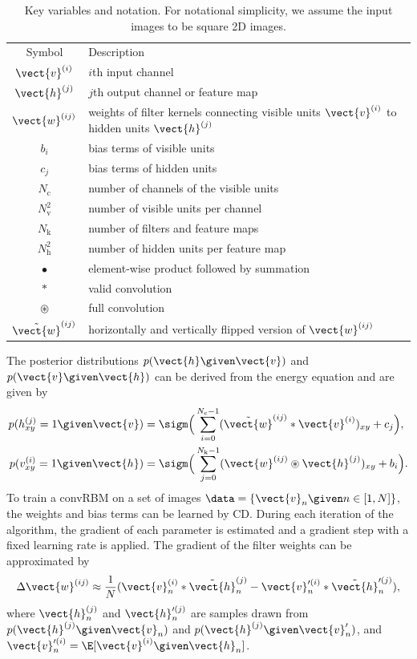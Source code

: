 \begin{table} 
\caption{Key variables and notation. For notational simplicity,
we assume the input images to be square 2D images.}
\label{tab:notation}
\begin{center}
\begin{tabular}{@{}cL{10cm}@{}}
\toprule
Symbol & Description \\
\cmidrule(r){1-1}\cmidrule(l){2-2}
$\vect{v}^{(i)}$ & $i$th input channel \\
$\vect{h}^{(j)}$ & $j$th output channel or feature map \\
$\vect{w}^{(ij)}$ & weights of filter kernels connecting visible units
$\vect{v}^{(i)}$ to hidden units $\vect{h}^{(j)}$ \\
$b_i$ & bias terms of visible units \\
$c_j$ & bias terms of hidden units \\
$N_\text{c}$ & number of channels of the visible units \\
$N_\text{v}^2$ & number of visible units per channel \\
$N_\text{k}$ & number of filters and feature maps \\
$N_\text{h}^2$ & number of hidden units per feature map \\
$\bullet$ & element-wise product followed by summation \\
$*$ & valid convolution \\
$\circledast$ & full convolution \\
$\tilde{\vect{w}}^{(ij)}$ & horizontally and vertically flipped version of
$\vect{w}^{(ij)}$ \\
\bottomrule
\end{tabular}
\end{center}
\end{table}
The posterior distributions $p(\vect{h} \given \vect{v})$ and $p(\vect{v} \given
\vect{h})$ can be derived from the energy equation and are given by
\begin{align}
p(h_{xy}^{(j)} = 1 \given \vect{v}) &= \sigm\Big(\sum_{i=0}^{N_\text{c}-1}
(\tilde{\vect{w}}^{(ij)}*\vect{v}^{(i)})_{xy} + c_j\Big), \\ 
p(v_{xy}^{(i)} = 1 \given \vect{h}) &= \sigm\Big(\sum_{j=0}^{N_\text{k}-1}
(\vect{w}^{(ij)} \circledast \vect{h}^{(j)})_{xy} + b_i\Big).
\end{align}
To train a convRBM on a set of images $\data = \{\vect{v}_n \given n \in
[1,N]\}$, the weights and bias terms can be learned by CD. During each iteration
of the algorithm, the gradient of each parameter is estimated and a gradient
step with a fixed learning rate is applied. The gradient of the filter weights
can be approximated by
\begin{equation}
\Delta \vect{w}^{(ij)} \approx
\frac{1}{N}(\vect{v}^{(i)}_n*\tilde{\vect{h}}^{(j)}_n -
\vect{v}'^{(i)}_n*\tilde{\vect{h}}_n'^{(j)}),
\label{eq:convgra}
\end{equation}
where $\vect{h}_n^{(j)}$ and $\vect{h}'^{(j)}_n$ are samples drawn from
$p(\vect{h}^{(j)} \given \vect{v}_n)$ and $p(\vect{h}^{(j)} \given
\vect{v}'_n)$, and $\vect{v}'^{(i)}_n = \E[\vect{v}^{(i)} \given \vect{h}_n]$.

